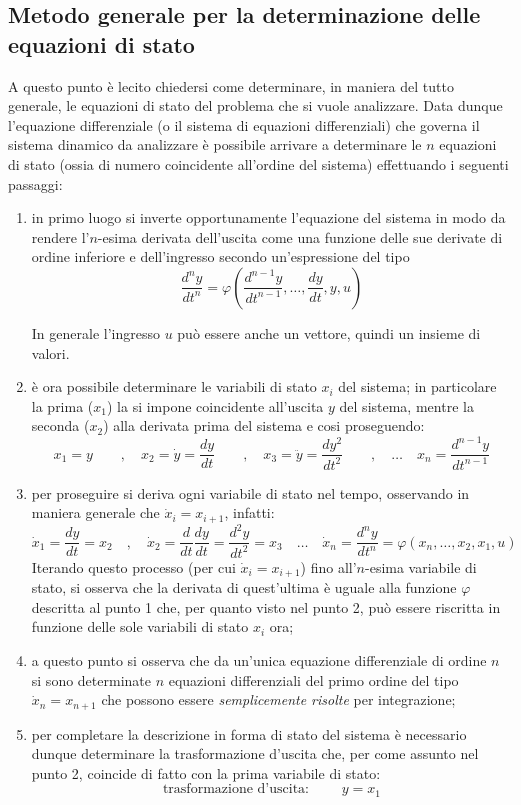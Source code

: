 	\subsection{Metodo generale per la determinazione delle equazioni di stato} \label{sec:intro:metodogenerale}
		A questo punto è lecito chiedersi come determinare, in maniera del tutto generale, le equazioni di stato del problema che si vuole analizzare. Data dunque l'equazione differenziale (o il sistema di equazioni differenziali) che governa il sistema dinamico da analizzare è possibile arrivare a determinare le $n$ equazioni di stato (ossia di numero coincidente all'ordine del sistema) effettuando i seguenti passaggi:
		\begin{enumerate}
			\item in primo luogo si inverte opportunamente l'equazione del sistema in modo da rendere l'$n$-esima derivata dell'uscita come una funzione delle sue derivate di ordine inferiore e dell'ingresso secondo un'espressione del tipo
			\[ \frac{d^n y}{dt^n} = \varphi \left( \frac{d^{n-1}y}{dt^{n-1}}, \dots, \frac{dy}{dt}, y, u \right)  \]
			\begin{nota}
				In generale l'ingresso $u$ può essere anche un vettore, quindi un insieme di valori.
			\end{nota}
			
			\item è ora possibile determinare le variabili di stato $x_i$ del sistema; in particolare la prima ($x_1$) la si impone coincidente all'uscita $y$ del sistema, mentre la seconda ($x_2$) alla derivata prima del sistema e cosi proseguendo:
			\[ x_1 = y \qquad,\quad x_2 = \dot y = \frac{dy}{dt} \qquad, \quad x_3 = \ddot y = \frac{dy^2}{dt^2} \qquad, \quad \dots \quad x_n = \frac{d^{n-1}y}{dt^{n-1}} \]
			
			\item per proseguire si deriva ogni variabile di stato nel tempo, osservando in maniera generale che $\dot x_{i} = x_{i+1}$, infatti:
			\[ \dot x_1 = \frac{dy}{dt} = x_2 \quad, \quad \dot x_2 = \frac d {dt} \frac{dy}{dt} = \frac{d^2y}{dt^2} = x_3 \quad \dots \quad \dot x_n = \frac{d^n y}{dt^n} =\varphi \left( x_n, \dots, x_2,x_1, u \right) \]
			Iterando questo processo (per cui $\dot x_i = x_{i+1}$) fino all'$n$-esima variabile di stato, si osserva che la derivata di quest'ultima è uguale alla funzione $\varphi$ descritta al punto 1 che, per quanto visto nel punto 2, può essere riscritta in funzione delle sole variabili di stato $x_i$ ora;
			
			\item a questo punto si osserva che da un'unica equazione differenziale di ordine $n$ si sono determinate $n$ equazioni differenziali del primo ordine del tipo $\dot x_n = x_{n+1}$ che possono essere \textit{semplicemente risolte} per integrazione;
			
			\item per completare la descrizione in forma di stato del sistema è necessario dunque determinare la trasformazione d'uscita che, per come assunto nel punto 2, coincide di fatto con la prima variabile di stato:
			\[ \textrm{trasformazione d'uscita: } \qquad y = x_1 \]
		\end{enumerate}
		
